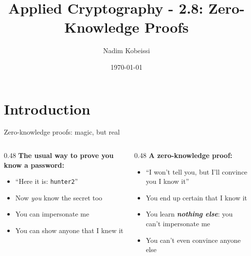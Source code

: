\ifdefined\PRESENTATION\else\PassOptionsToClass{handout}{beamer}\fi\documentclass[aspectratio=169, lualatex]{beamer}
\title{Applied Cryptography - 2.8: Zero-Knowledge Proofs}
\author{Nadim Kobeissi}
\institute{Symbolic Software}
\date{\today}
\begin{document}
\begin{frame}[plain]
	\titlepage
\end{frame}

\section{Introduction}

\begin{frame}{Zero-knowledge proofs: magic, but real}
	\begin{columns}[T]
		\begin{column}{0.48\textwidth}
			\textbf{The usual way to prove you know a password:}
			\begin{itemize}
				\item ``Here it is: \texttt{hunter2}''
				\item Now \textit{you} know the secret too
				\item You can impersonate me
				\item You can show anyone that I knew it
			\end{itemize}
		\end{column}
		\pause
		\begin{column}{0.48\textwidth}
			\textbf{A zero-knowledge proof:}
			\begin{itemize}
				\item ``I won't tell you, but I'll convince you I know it''
				\item You end up certain that I know it
				\item You learn \textit{\textbf{nothing else}}: you can't impersonate me
				\item You can't even convince anyone else
			\end{itemize}
		\end{column}
	\end{columns}
\end{frame}
\end{document}
